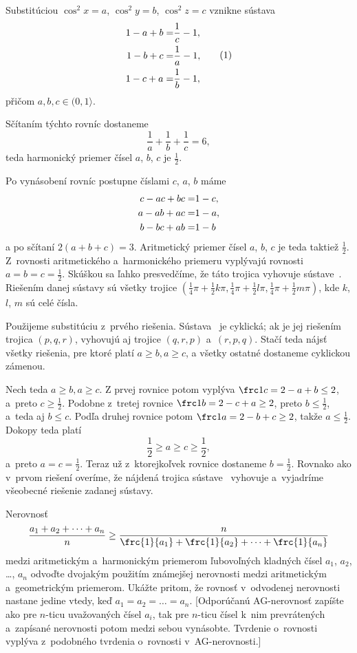 {%
Substitúciou $\cos^2x=a$, $ \cos^2y=b$, $ \cos^2z=c$ vznikne sústava
$$
\aligned
1-a+b=&\frac1c-1,\\
1-b+c=&\frac1a-1, \\
1-c+a=&\frac1b-1,
\endaligned\tag1
$$
přičom $a,b,c\in(0,1\rangle$.

Sčítaním týchto rovníc dostaneme
$$
\frac1a+\frac1b+\frac1c=6,
$$
teda harmonický priemer čísel $a$, $b$, $c$ je $\frac12$.

Po vynásobení rovníc postupne číslami $c$, $a$, $b$ máme
$$
\aligned
c-ac+bc=&1-c,\\
a-ab+ac=&1-a,\\
b-bc+ab=&1-b
\endaligned
$$
a po sčítaní $2(a+b+c)=3$. Aritmetický priemer čísel $a$, $b$, $c$ je teda taktiež
$\frac12$. Z~rovnosti aritmetického
a~harmonického priemeru vyplývajú rovnosti $a=b=c=\frac12$. Skúškou sa ľahko presvedčíme, že táto trojica vyhovuje
sústave~. Riešením danej sústavy sú všetky trojice
$(\frac14{\pi}+\frac12{k\pi},\frac14{\pi}+\frac12{l\pi},\frac14{\pi}+\frac12{m\pi})$,
kde $k$, $l$, $m$ sú celé čísla.

\ineriesenie
Použijeme substitúciu z~prvého riešenia.
Sústava~ je cyklická; ak je jej riešením trojica $(p,q,r)$, vyhovujú aj trojice $(q,r,p)$ a~$(r,p,q)$.
Stačí teda nájsť všetky riešenia, pre ktoré platí $a\ge b, a\ge c$, a všetky ostatné dostaneme cyklickou zámenou.

Nech teda $a\ge b, a\ge c$. Z prvej rovnice potom vyplýva $\frc1c=2-a+b\le2$, a~preto $c\ge\frac12$. Podobne z~tretej
rovnice $\frc1b=2-c+a\ge2$, preto $b\le\frac12$, a~teda aj $b\le c$.
Podľa druhej rovnice potom $\frc1a=2-b+c\ge2$, takže $a\le\frac12$.
Dokopy teda platí
$$
\frac12\ge a\ge c\ge\frac12,
$$
a~preto $a=c=\frac12$. Teraz už z~ktorejkoľvek rovnice dostaneme $b=\frac12$. Rovnako ako v~prvom riešení overíme, že
nájdená trojica sústave~ vyhovuje a~vyjadríme všeobecné riešenie zadanej sústavy.

Nerovnosť
$$
\frac{a_1+a_2+\dots+a_n}{n}\ge
\frac{n}{\frc{1}{a_1}+\frc{1}{a_2}+\dots+\frc{1}{a_n}}
$$
medzi aritmetickým a~harmonickým priemerom
ľubovoľných kladných čísel $a_1$, $a_2$, \dots, $a_n$ odvoďte dvojakým
použitím známejšej nerovnosti medzi aritmetickým a~geometrickým priemerom.
Ukážte pritom, že rovnosť v~odvodenej nerovnosti nastane jedine vtedy, keď
$a_1=a_2=\dots=a_n$. [Odporúčanú AG-nerovnosť zapíšte ako pre
$n$-ticu uvažovaných čísel $a_i$,
tak pre $n$-ticu čísel k~nim prevrátených
a~zapísané nerovnosti potom medzi sebou vynásobte. Tvrdenie o~rovnosti vyplýva z~podobného tvrdenia o~rovnosti v~AG-nerovnosti.]

}
